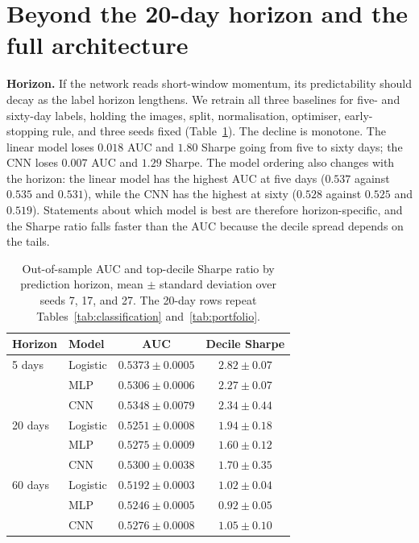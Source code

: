 \documentclass[10pt]{article}
\begin{document}
\section{Beyond the 20-day horizon and the full architecture}
\label{sec:beyond}

\textbf{Horizon.} If the network reads short-window momentum, its predictability should decay as the label horizon lengthens. We retrain all three baselines for five- and sixty-day labels, holding the images, split, normalisation, optimiser, early-stopping rule, and three seeds fixed (Table~\ref{tab:horizons}). The decline is monotone. The linear model loses $0.018$ AUC and $1.80$ Sharpe going from five to sixty days; the CNN loses $0.007$ AUC and $1.29$ Sharpe. The model ordering also changes with the horizon: the linear model has the highest AUC at five days ($0.537$ against $0.535$ and $0.531$), while the CNN has the highest at sixty ($0.528$ against $0.525$ and $0.519$). Statements about which model is best are therefore horizon-specific, and the Sharpe ratio falls faster than the AUC because the decile spread depends on the tails.

\begin{table}[t]
\centering
\small
\caption{Out-of-sample AUC and top-decile Sharpe ratio by prediction horizon, mean $\pm$ standard deviation over seeds 7, 17, and 27. The 20-day rows repeat Tables~\ref{tab:classification} and~\ref{tab:portfolio}.}
\label{tab:horizons}
\begin{tabular}{llcc}
\toprule
Horizon & Model & AUC & Decile Sharpe \\
\midrule
5 days  & Logistic & $0.5373\pm0.0005$ & $2.82\pm0.07$ \\
        & MLP      & $0.5306\pm0.0006$ & $2.27\pm0.07$ \\
        & CNN      & $0.5348\pm0.0079$ & $2.34\pm0.44$ \\
20 days & Logistic & $0.5251\pm0.0008$ & $1.94\pm0.18$ \\
        & MLP      & $0.5275\pm0.0009$ & $1.60\pm0.12$ \\
        & CNN      & $0.5300\pm0.0038$ & $1.70\pm0.35$ \\
60 days & Logistic & $0.5192\pm0.0003$ & $1.02\pm0.04$ \\
        & MLP      & $0.5246\pm0.0005$ & $0.92\pm0.05$ \\
        & CNN      & $0.5276\pm0.0008$ & $1.05\pm0.10$ \\
\bottomrule
\end{tabular}
\end{table}
\end{document}
